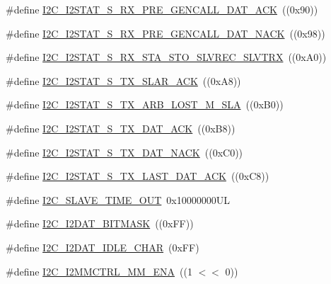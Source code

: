 \begin{DoxyCompactItemize}
\#define \hyperlink{group___i2_c__18_x_x__43_x_x_ga75dd46ddb054c4d47a531b8e90f7f446}{I2\+C\+\_\+\+I2\+S\+T\+A\+T\+\_\+\+S\+\_\+\+R\+X\+\_\+\+P\+R\+E\+\_\+\+G\+E\+N\+C\+A\+L\+L\+\_\+\+D\+A\+T\+\_\+\+A\+CK}~((0x90))
\item 
\#define \hyperlink{group___i2_c__18_x_x__43_x_x_ga20c65f8a82c18211127e5c335026bd76}{I2\+C\+\_\+\+I2\+S\+T\+A\+T\+\_\+\+S\+\_\+\+R\+X\+\_\+\+P\+R\+E\+\_\+\+G\+E\+N\+C\+A\+L\+L\+\_\+\+D\+A\+T\+\_\+\+N\+A\+CK}~((0x98))
\item 
\#define \hyperlink{group___i2_c__18_x_x__43_x_x_ga7afe9f0e54aeb9ce8428c0adeb3c3274}{I2\+C\+\_\+\+I2\+S\+T\+A\+T\+\_\+\+S\+\_\+\+R\+X\+\_\+\+S\+T\+A\+\_\+\+S\+T\+O\+\_\+\+S\+L\+V\+R\+E\+C\+\_\+\+S\+L\+V\+T\+RX}~((0x\+A0))
\item 
\#define \hyperlink{group___i2_c__18_x_x__43_x_x_gae6dcbdd1f01f7ebf3595722770e3b7b6}{I2\+C\+\_\+\+I2\+S\+T\+A\+T\+\_\+\+S\+\_\+\+T\+X\+\_\+\+S\+L\+A\+R\+\_\+\+A\+CK}~((0x\+A8))
\item 
\#define \hyperlink{group___i2_c__18_x_x__43_x_x_gac71ac23a80e1bdb700a2c37170031107}{I2\+C\+\_\+\+I2\+S\+T\+A\+T\+\_\+\+S\+\_\+\+T\+X\+\_\+\+A\+R\+B\+\_\+\+L\+O\+S\+T\+\_\+\+M\+\_\+\+S\+LA}~((0x\+B0))
\item 
\#define \hyperlink{group___i2_c__18_x_x__43_x_x_gaeb92fe85cc3f6c813cb91685234ac08c}{I2\+C\+\_\+\+I2\+S\+T\+A\+T\+\_\+\+S\+\_\+\+T\+X\+\_\+\+D\+A\+T\+\_\+\+A\+CK}~((0x\+B8))
\item 
\#define \hyperlink{group___i2_c__18_x_x__43_x_x_gad9cdcd8c06924252a2ad9baced97d838}{I2\+C\+\_\+\+I2\+S\+T\+A\+T\+\_\+\+S\+\_\+\+T\+X\+\_\+\+D\+A\+T\+\_\+\+N\+A\+CK}~((0x\+C0))
\item 
\#define \hyperlink{group___i2_c__18_x_x__43_x_x_ga3e4522387958da1da6017a6e48a0daad}{I2\+C\+\_\+\+I2\+S\+T\+A\+T\+\_\+\+S\+\_\+\+T\+X\+\_\+\+L\+A\+S\+T\+\_\+\+D\+A\+T\+\_\+\+A\+CK}~((0x\+C8))
\item 
\#define \hyperlink{group___i2_c__18_x_x__43_x_x_ga33116b352c72ef28879812c66387f17a}{I2\+C\+\_\+\+S\+L\+A\+V\+E\+\_\+\+T\+I\+M\+E\+\_\+\+O\+UT}~0x10000000\+UL
\item 
\#define \hyperlink{group___i2_c__18_x_x__43_x_x_gac66b7c81c93cc59f69d204b4eb7d639b}{I2\+C\+\_\+\+I2\+D\+A\+T\+\_\+\+B\+I\+T\+M\+A\+SK}~((0x\+F\+F))
\item 
\#define \hyperlink{group___i2_c__18_x_x__43_x_x_ga5b04af302e0e4007df123dff0328ac5e}{I2\+C\+\_\+\+I2\+D\+A\+T\+\_\+\+I\+D\+L\+E\+\_\+\+C\+H\+AR}~(0x\+F\+F)
\item 
\#define \hyperlink{group___i2_c__18_x_x__43_x_x_ga8dc8fa566a5113c3e1b35c0580d90d9f}{I2\+C\+\_\+\+I2\+M\+M\+C\+T\+R\+L\+\_\+\+M\+M\+\_\+\+E\+NA}~((1 $<$$<$ 0))
$$
\end{DoxyCompactItemize}
